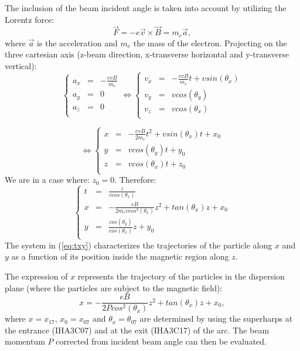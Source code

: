 The inclusion of the beam incident angle is taken into account by utilizing the Lorentz force:
\begin{equation}
\vec{F}=-e\vec{v}\times \vec{B} = m_e\vec{a},
\end{equation}
where $\vec{a}$ is the acceleration and $m_e$ the mass of the electron. Projecting on the three cartesian
axis (z-beam direction, x-transverse horizontal and y-transverse vertical):
\begin{equation}
\left \{
\begin{array}{lll}
a_x & = & -\frac{evB}{m_e} 	\\
a_y & = & 0			\\
a_z & = & 0			\\
\end{array}
\right .
\Leftrightarrow
\left \{
\begin{array}{lll}
v_x & = &  -\frac{evB}{m_e}t + vsin(\theta _x)	\\
v_y & = & vcos(\theta _y)				\\
v_z & = & vcos(\theta _x)				\\
\end{array}
\right .
\end{equation}

\begin{equation}
\Leftrightarrow
\left \{
\begin{array}{lll}\label{eq:txy}
x & = &  -\frac{evB}{2m_e}t^2 + vsin(\theta _x)t + x_0	\\
y & = & vcos(\theta _y)t + y_0				\\
z & = & vcos(\theta _x)t + z_0				\\
\end{array}
\right .
\end{equation}
We are in a case where: $z_0 = 0$. Therefore:
\begin{equation}
\left \{
\begin{array}{lll}
t & = & \frac{z}{vcos(\theta_x)}					\\
x & = & -\frac{eB}{2m_evcos^2(\theta _x)}z^2 + tan(\theta _x)z + x_0	\\
y & = & \frac{cos(\theta _y)}{cos(\theta _x)}z + y_0			\\
\end{array}
\right .
\end{equation}
The system in (\ref{eq:txy}) characterizes the trajectories of the particle along
$x$ and $y$ as a function of its position inside the magnetic region along $z$.

The expression of $x$ represents the trajectory of the particles in the dispersion plane
(where the particles are subject to the magnetic field):
\begin{equation}
x = -\frac{eB}{2Pcos^2(\theta _x)}z^2 + tan(\theta _x)z + x_0,
\end{equation}
where $x = x_{17}$, $x_0 = x_{07}$ and $\theta _x = \theta _{07}$ are determined by using the superharps
at the entrance (IHA3C07) and at the exit (IHA3C17) of the arc. The beam momentum $P$ corrected from
incident beam angle can then be evaluated.

